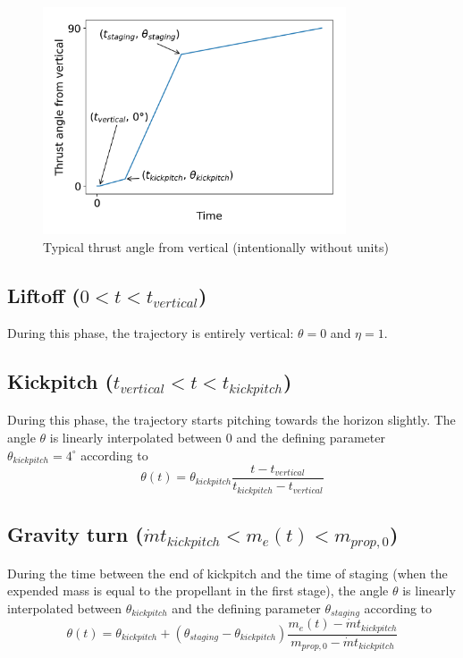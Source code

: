 \documentclass[11pt]{article}
\begin{document}
\begin{figure}[H]
  \centering
  \includegraphics[width=0.8\textwidth]{./plots/angleFromVertical.png}
  \caption{Typical thrust angle from vertical (intentionally without units)}
\end{figure}

\subsection{Liftoff ($0 < t < t_{vertical}$)}
During this phase, the trajectory is entirely vertical: $\theta = 0$ and $\eta = 1$.

\subsection{Kickpitch ($t_{vertical} < t < t_{kickpitch}$)}
During this phase, the trajectory starts pitching towards the horizon slightly.
The angle $\theta$ is linearly interpolated between 0 and the defining parameter $\theta_{kickpitch} = 4^{\circ}$ according to
$$
\theta(t) = \theta_{kickpitch} \frac{t - t_{vertical}}{t_{kickpitch} - t_{vertical}}
$$

\subsection{Gravity turn ($\dot{m} t_{kickpitch} < m_e(t) < m_{prop,0}$)}
During the time between the end of kickpitch and the time of staging (when the expended mass is equal to the propellant in the first stage),
the angle $\theta$ is linearly interpolated between $\theta_{kickpitch}$ and the defining parameter $\theta_{staging}$ according to
$$
\theta(t) = \theta_{kickpitch} + \left( \theta_{staging} - \theta_{kickpitch} \right) \frac{m_e(t) - \dot{m} t_{kickpitch}}{m_{prop,0} - \dot{m} t_{kickpitch}}
$$
\end{document}
